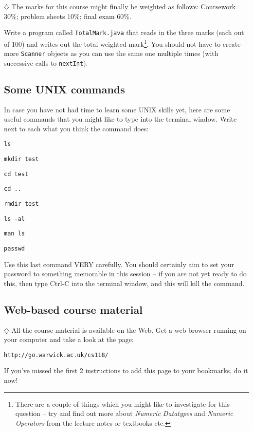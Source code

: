$\diamondsuit$ 
The marks for this course might finally be weighted as follows: 
Coursework 30\%; problem sheets 10\%; final exam 60\%. 

Write a program called {\tt TotalMark.java} that reads in the
three marks (each out of 100) and writes out the total weighted
mark\footnote{There are a couple of things which you might like to 
investigate for this question -- try and find out more about {\em Numeric
Datatypes} and {\em Numeric Operators} from the lecture notes or textbooks 
etc.}. You should not have to create more {\tt Scanner} objects as you can use
the same one multiple times (with successive calls to {\tt nextInt}).


\subsection{Some UNIX commands}

In case you have not had time to learn some UNIX skills yet, here are some useful 
commands that you might like to type into the terminal window. Write next 
to each what you think the command does: 

\indent
{\tt ls} 

\indent
{\tt mkdir test} 

\indent
{\tt cd test} 

\indent
{\tt cd ..} 

\indent
{\tt rmdir test} 

\indent
{\tt ls -al} 

\indent
{\tt man ls} 

\indent
{\tt passwd} 

Use this last command VERY carefully. You should certainly aim to set your
password to something memorable in this session -- if you are not yet 
ready to do this, then type Ctrl-C into the 
terminal window, and this will kill the command. 


\subsection{Web-based course material}

$\diamondsuit$ 
All the course material is available on the Web. Get a web browser
running on your computer and take a look at the page: 

{\tt http://go.warwick.ac.uk/cs118/} 

If you've missed the first 2 instructions to add this page to your bookmarks, do it now! 

